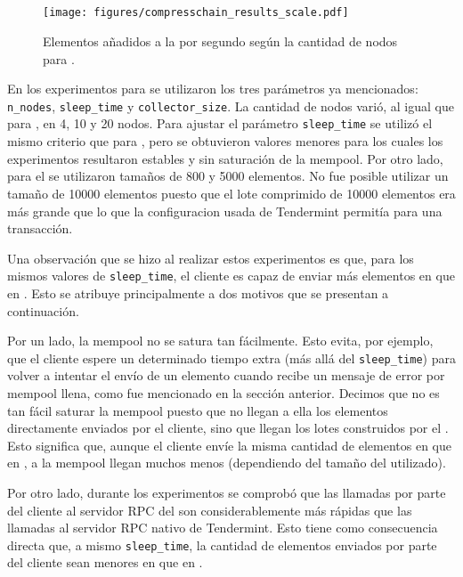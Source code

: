 \subsection{\compresschain}

\begin{figure}
	\centering
	\texttt{[image: figures/compresschain\_results\_scale.pdf]}
	\caption{Elementos añadidos a la \setchain por segundo según la cantidad de nodos para \compresschain.}
	\label{fig:compresschain_results}
\end{figure}

En los experimentos para \compresschain se utilizaron los tres parámetros ya mencionados: \texttt{n\_nodes},
\texttt{sleep\_time} y \texttt{collector\_size}.
La cantidad de nodos varió, al igual que para \vanilla, en 4, 10 y 20 nodos.
Para ajustar el parámetro \texttt{sleep\_time} se utilizó el mismo criterio que para \vanilla, pero se obtuvieron valores 
menores para los cuales los experimentos resultaron estables y sin saturación de la mempool.
Por otro lado, para el \collector se utilizaron tamaños de 800 y 5000 elementos.
No fue posible utilizar un tamaño de 10000 elementos puesto que el lote comprimido de 10000 elementos era más grande
que lo que la configuracion usada de Tendermint permitía para una transacción. 

Una observación que se hizo al realizar estos experimentos es que, para los mismos valores de \texttt{sleep\_time},
el cliente es capaz de enviar más elementos en \compresschain que en \vanilla.
Esto se atribuye principalmente a dos motivos que se presentan a continuación.

Por un lado, la mempool no se satura tan fácilmente. Esto evita, por ejemplo, que el cliente espere un determinado tiempo
extra (más allá del \texttt{sleep\_time}) para volver a intentar el envío de un elemento cuando recibe un mensaje de error por mempool llena,
como fue mencionado en la sección anterior.
Decimos que no es tan fácil saturar la mempool puesto que no llegan a ella los elementos directamente enviados por el cliente,
sino que llegan los lotes construidos por el \collector.
Esto significa que, aunque el cliente envíe la misma cantidad de elementos en \vanilla que en \compresschain, a la mempool llegan
muchos menos (dependiendo del tamaño del \collector utilizado).

Por otro lado, durante los experimentos se comprobó que las llamadas por parte del cliente al servidor RPC del \collector
son considerablemente más rápidas que las llamadas al servidor RPC nativo de Tendermint.
Esto tiene como consecuencia directa que, a mismo \texttt{sleep\_time}, la cantidad de elementos enviados por parte del cliente
sean menores en \vanilla que en \compresschain.


